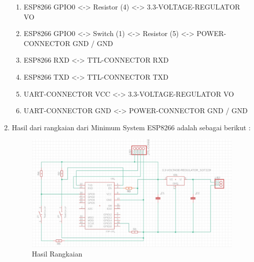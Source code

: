\begin{enumerate}
\begin{enumerate}
            \item ESP8266 GPIO0 <-> Resistor (4) <-> 3.3-VOLTAGE-REGULATOR VO
            \item ESP8266 GPIO0 <-> Switch (1) <-> Resistor (5) <->  POWER-CONNECTOR GND / GND
            \item ESP8266 RXD <-> TTL-CONNECTOR RXD
            \item ESP8266 TXD <-> TTL-CONNECTOR TXD
            \item UART-CONNECTOR VCC <-> 3.3-VOLTAGE-REGULATOR VO
            \item UART-CONNECTOR GND <->  POWER-CONNECTOR GND / GND
        \end{enumerate}
    \item Hasil dari rangkaian dari Minimum System ESP8266 adalah sebagai berikut :
        \begin{figure}[H]
            \centering
            \includegraphics[width=0.6\linewidth]{P1/img/gambar23.jpeg}
            \caption{Hasil Rangkaian} 
            \label{fig:Hasil Rangkaian}
        \end{figure}
\end{enumerate}
        

